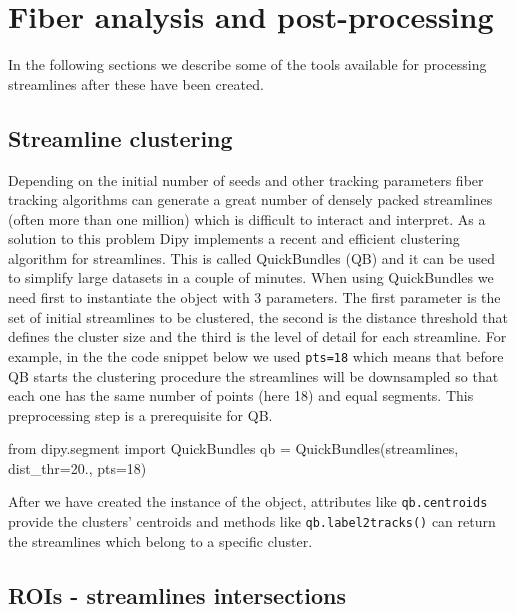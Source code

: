 \documentclass{bioinfo}
\begin{document}
\section{Fiber analysis and post-processing}\label{post_tracking}

In the following sections we describe some of the tools available for processing
streamlines after these have been created.
\subsection{Streamline clustering}\label{quickbundles}
Depending on the initial number of seeds and other tracking parameters
fiber tracking algorithms can generate a great number of densely packed
streamlines (often more than one million) which is difficult to interact
and interpret. As a solution to this problem Dipy implements a recent and
efficient clustering algorithm for streamlines. This is called QuickBundles (QB)
\citep{Garyfallidis_thesis,garyfallidis-etal:12} and it can be used to
simplify large datasets in a couple of minutes.
When using QuickBundles we need first to instantiate the object with 3
parameters. The first parameter is the set of initial streamlines to be
clustered, the second is the distance threshold that defines the cluster size
and the third is the level of detail for each streamline. For example, in the
the code snippet below we used \texttt{pts=18} which means that before QB
starts the clustering procedure the streamlines will be downsampled so that
each one has the same number of points (here 18) and equal segments. This
preprocessing step is a prerequisite for QB.
\begin{python}
from dipy.segment import QuickBundles
qb = QuickBundles(streamlines, dist_thr=20.,
                  pts=18)
\end{python}
After we have created the instance of the object, attributes like
\texttt{qb.centroids} provide the clusters' centroids and methods like
\texttt{qb.label2tracks()} can return the streamlines which belong to a
specific cluster.

\subsection{ROIs - streamlines intersections}
\end{document}
